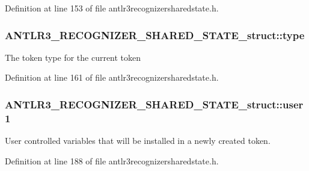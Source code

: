 Definition at line 153 of file antlr3recognizersharedstate.\-h.

\hypertarget{struct_a_n_t_l_r3___r_e_c_o_g_n_i_z_e_r___s_h_a_r_e_d___s_t_a_t_e__struct_a063a31e4a8fa81e87254c6be0ce281cd}{
\subsubsection[{type}]{ A\-N\-T\-L\-R3\-\_\-\-R\-E\-C\-O\-G\-N\-I\-Z\-E\-R\-\_\-\-S\-H\-A\-R\-E\-D\-\_\-\-S\-T\-A\-T\-E\-\_\-struct\-::type}}\label{struct_a_n_t_l_r3___r_e_c_o_g_n_i_z_e_r___s_h_a_r_e_d___s_t_a_t_e__struct_a063a31e4a8fa81e87254c6be0ce281cd}
The token type for the current token 

Definition at line 161 of file antlr3recognizersharedstate.\-h.

\hypertarget{struct_a_n_t_l_r3___r_e_c_o_g_n_i_z_e_r___s_h_a_r_e_d___s_t_a_t_e__struct_a66ef44cb1ffa25ff87a60d88451f5c51}{
\subsubsection[{user1}]{ A\-N\-T\-L\-R3\-\_\-\-R\-E\-C\-O\-G\-N\-I\-Z\-E\-R\-\_\-\-S\-H\-A\-R\-E\-D\-\_\-\-S\-T\-A\-T\-E\-\_\-struct\-::user1}}\label{struct_a_n_t_l_r3___r_e_c_o_g_n_i_z_e_r___s_h_a_r_e_d___s_t_a_t_e__struct_a66ef44cb1ffa25ff87a60d88451f5c51}
User controlled variables that will be installed in a newly created token. 

Definition at line 188 of file antlr3recognizersharedstate.\-h.

